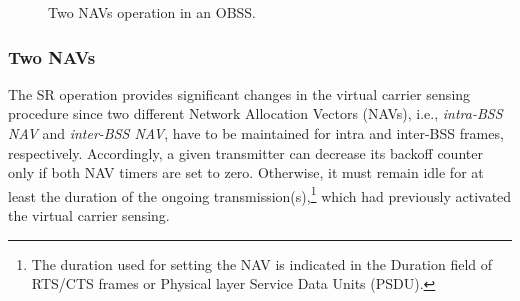 \documentclass{ieeeaccess}
\begin{document}
\begin{figure}[ht!]
	\centering
	\hspace{1cm}
	\caption{Two NAVs operation in an OBSS.}
	\label{fig:two_navs}
\end{figure}
\subsubsection{Two NAVs}
\label{section:two_navs}
The SR operation provides significant changes in the virtual carrier sensing procedure since two different Network Allocation Vectors (NAVs), i.e., \emph{intra-BSS NAV} and \emph{inter-BSS NAV}, have to be maintained for intra and inter-BSS frames, respectively. Accordingly, a given transmitter can decrease its backoff counter only if both NAV timers are set to zero. Otherwise, it must remain idle for at least the duration of the ongoing transmission(s),\footnote{The duration used for setting the NAV is indicated in the Duration field of RTS/CTS frames or Physical layer Service Data Units (PSDU).} which had previously activated the virtual carrier sensing. 
\end{document}
